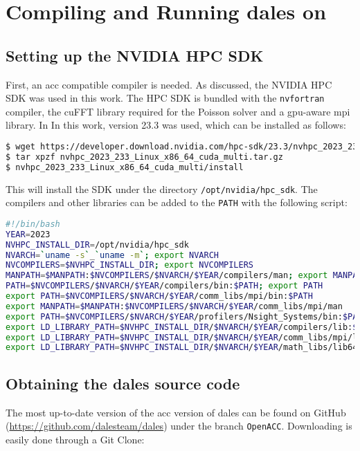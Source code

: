 \chapter{Compiling and Running \acrshort{dales} on }

\section{Setting up the NVIDIA HPC SDK}

First, an \acrshort{acc} compatible compiler is needed. As discussed, the NVIDIA HPC SDK was used in this work. The HPC SDK is bundled with the \texttt{nvfortran} compiler, the cuFFT library required for the Poisson solver and a \acrshort{gpu}-aware \acrshort{mpi} library. In In this work, version 23.3 was used, which can be installed as follows:

\begin{lstlisting}[language=bash]
$ wget https://developer.download.nvidia.com/hpc-sdk/23.3/nvhpc_2023_233_Linux_x86_64_cuda_multi.tar.gz
$ tar xpzf nvhpc_2023_233_Linux_x86_64_cuda_multi.tar.gz
$ nvhpc_2023_233_Linux_x86_64_cuda_multi/install
\end{lstlisting}

This will install the SDK under the directory \texttt{/opt/nvidia/hpc\_sdk}. The compilers and other libraries can be added to the \texttt{PATH} with the following script:

\begin{lstlisting}[language=bash]
#!/bin/bash
YEAR=2023
NVHPC_INSTALL_DIR=/opt/nvidia/hpc_sdk
NVARCH=`uname -s`_`uname -m`; export NVARCH
NVCOMPILERS=$NVHPC_INSTALL_DIR; export NVCOMPILERS
MANPATH=$MANPATH:$NVCOMPILERS/$NVARCH/$YEAR/compilers/man; export MANPATH
PATH=$NVCOMPILERS/$NVARCH/$YEAR/compilers/bin:$PATH; export PATH
export PATH=$NVCOMPILERS/$NVARCH/$YEAR/comm_libs/mpi/bin:$PATH
export MANPATH=$MANPATH:$NVCOMPILERS/$NVARCH/$YEAR/comm_libs/mpi/man
export PATH=$NVCOMPILERS/$NVARCH/$YEAR/profilers/Nsight_Systems/bin:$PATH
export LD_LIBRARY_PATH=$NVHPC_INSTALL_DIR/$NVARCH/$YEAR/compilers/lib:$LD_LIBRARY_PATH
export LD_LIBRARY_PATH=$NVHPC_INSTALL_DIR/$NVARCH/$YEAR/comm_libs/mpi/lib:$LD_LIBRARY_PATH
export LD_LIBRARY_PATH=$NVHPC_INSTALL_DIR/$NVARCH/$YEAR/math_libs/lib64:$LD_LIBRARY_PATH
\end{lstlisting}

\section{Obtaining the \acrshort{dales} source code}
The most up-to-date version of the \acrshort{acc} version of \acrshort{dales} can be found on GitHub (\url{https://github.com/dalesteam/dales}) under the branch \texttt{OpenACC}. Downloading is easily done through a Git Clone:

